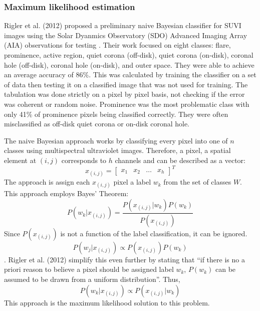\documentclass[twoside]{report}
\begin{document}
\subsubsection{Maximum likelihood estimation}\label{sec:riglermaxlikelihood}

Rigler et al. (2012) proposed a preliminary naive Bayesian classifier for SUVI images using the Solar Dyanmics Observatory (SDO) Advanced Imaging Array (AIA) observations for testing \cite{rigler:2012}. Their work focused on eight classes: flare, prominence, active region, quiet corona (off-disk), quiet corona (on-disk), coronal hole (off-disk), coronal hole (on-disk), and outer space. They were able to achieve an average accuracy of 86\%. This was calculated by training the classifier on a set of data then testing it on a classified image that was not used for training. The tabulation was done strictly on a pixel by pixel basis, not checking if the error was coherent or random noise. Prominence was the most problematic class with only 41\% of prominence pixels being classified correctly. They were often misclassified as off-disk quiet corona or on-disk coronal hole.

The naive Bayesian approach works by classifying every pixel into one of $n$ classes using multispectral ultraviolet images. Therefore, a pixel, a spatial element at $(i,j)$ corresponds to $h$ channels and can be described as a vector:
\[ x_{(i,j)} = \begin{bmatrix} x_1 & x_2 & \hdots & x_h \end{bmatrix}^T \]
The approach is assign each $x_{(i,j)}$ pixel a label $w_k$ from the set of classes $W$. This approach employs Bayes' Theorem:
\[ P(w_k | x_{(i,j)}) = \frac{P(x_{(i,j)} | w_k) P(w_k)}{P(x_{(i,j)})} \]
Since $P(x_{(i,j)})$ is not a function of the label classification, it can be ignored.
\[ P(w_j | x_{(i,j)}) \propto P(x_{(i,j)}) P(w_{k}) \].
Rigler et al. (2012) simplify this even further by stating that ``if there is no a priori reason to believe a pixel should be assigned label $w_k$, $P(w_k)$ can be assumed to be drawn from a uniform distribution''. Thus,
\[ P(w_k | x_{(i,j)}) \propto P(x_{(i,j)} | w_k) \]
This approach is the maximum likelihood solution to this problem.
\end{document}
